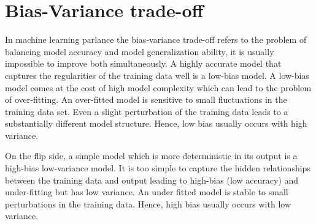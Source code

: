 \section{Bias-Variance trade-off}

In machine learning parlance the bias-variance trade-off refers to the problem of balancing model accuracy and model generalization ability, it is usually impossible to improve both simultaneously. A highly accurate model that captures the regularities of the training data well is a low-bias model. A low-bias model comes at the cost of high model complexity which can lead to the problem of over-fitting. An over-fitted model is sensitive to small fluctuations in the training data set. Even a slight perturbation of the training data leads to a substantially different model structure. Hence, low bias usually occurs with high variance. 

On the flip side, a simple model which is more deterministic in its output is a high-bias low-variance model. It is too simple to capture the hidden relationships between the training data and output leading to high-bias (low accuracy) and under-fitting but has low variance. An under fitted model is stable to small perturbations in the training data. Hence, high bias usually occurs with low variance.

